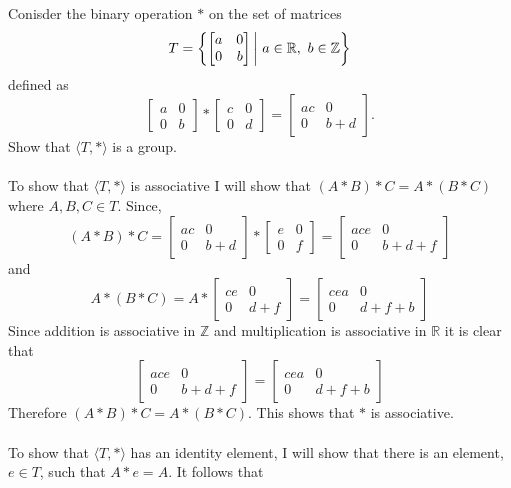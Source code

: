 \documentclass[titlepage]{article}
\newenvironment{problem}[2][Problem]{\begin{trivlist}
\item[\hskip \labelsep {\bfseries #1}\hskip \labelsep {\bfseries #2.}]}{\end{trivlist}}
\begin{document}
\begin{problem}{8}
	Conisder the binary operation $*$ on the set of matrices
	$$\mathnormal{T} = \left\{ \begin{bmatrix}a&0\\0&b\end{bmatrix} \bigg| \ a \in \mathbb{R}, \ b \in \mathbb{Z}\right\}$$
	defined as 
	$$ \begin{bmatrix} a&0\\0&b \end{bmatrix} *\begin{bmatrix} c&0\\0&d \end{bmatrix} 
	= \begin{bmatrix} ac&0\\0&b+d \end{bmatrix}.$$
	Show that $\langle T,* \rangle$ is a group.
	\\ \\
	To show that $\langle T,* \rangle$ is associative I will show that $(A*B)*C = A*(B*C)$ where $A,B,C \in T$. Since,
	$$ (A*B)*C = \begin{bmatrix} ac&0\\0&b+d\end{bmatrix} * \begin{bmatrix} e&0\\0&f \end{bmatrix} = \begin{bmatrix} ace&0\\0&b+d+f \end{bmatrix}$$
	and
	$$ A*(B*C) =A*\begin{bmatrix} ce&0\\0&d+f \end{bmatrix} = \begin{bmatrix} cea&0\\0&d+f+b \end{bmatrix}$$
Since addition is associative in $\mathbb{Z}$ and multiplication is associative in $\mathbb{R}$ it is clear that 
$$\begin{bmatrix} ace&0\\0&b+d+f \end{bmatrix} =   \begin{bmatrix} cea&0\\0&d+f+b \end{bmatrix}$$
Therefore $(A*B)*C = A*(B*C)$. This shows that $*$ is associative.
\\ \\
To show that $\langle T,* \rangle$ has an identity element, I will show that there is an element, $e \in T$, such that $A*e = A$. It follows that 

\end{problem}
\end{document}
